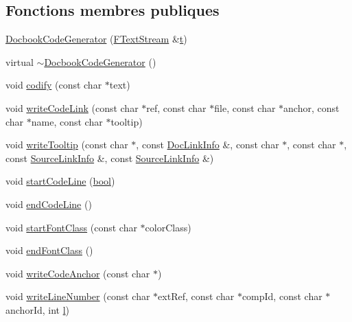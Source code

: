 \subsection*{Fonctions membres publiques}
\begin{DoxyCompactItemize}
\item 
\hyperlink{class_docbook_code_generator_a614697e6789639f7e8b67a7ba2ac31d3}{Docbook\+Code\+Generator} (\hyperlink{class_f_text_stream}{F\+Text\+Stream} \&\hyperlink{058__bracket__recursion_8tcl_a69e959f6901827e4d8271aeaa5fba0fc}{t})
\item 
virtual \hyperlink{class_docbook_code_generator_a9280e0d73c93714828a3650102ccef58}{$\sim$\+Docbook\+Code\+Generator} ()
\item 
void \hyperlink{class_docbook_code_generator_a7c2c177e3e6e0485e9806a75b45bd7a3}{codify} (const char $\ast$text)
\item 
void \hyperlink{class_docbook_code_generator_aecf4ade98ac3d63f22e3632f7dfb987a}{write\+Code\+Link} (const char $\ast$ref, const char $\ast$file, const char $\ast$anchor, const char $\ast$name, const char $\ast$tooltip)
\item 
void \hyperlink{class_docbook_code_generator_a5ce309cd68be3ce9eabbd2e522c1c286}{write\+Tooltip} (const char $\ast$, const \hyperlink{struct_doc_link_info}{Doc\+Link\+Info} \&, const char $\ast$, const char $\ast$, const \hyperlink{struct_source_link_info}{Source\+Link\+Info} \&, const \hyperlink{struct_source_link_info}{Source\+Link\+Info} \&)
\item 
void \hyperlink{class_docbook_code_generator_aa6af9297cbb2be8c975d0d123cf6d3b1}{start\+Code\+Line} (\hyperlink{qglobal_8h_a1062901a7428fdd9c7f180f5e01ea056}{bool})
\item 
void \hyperlink{class_docbook_code_generator_ab457dd3ab8b99073d9d2cc6f566bb712}{end\+Code\+Line} ()
\item 
void \hyperlink{class_docbook_code_generator_ab39e3a862244d1c8926895d69240ca0d}{start\+Font\+Class} (const char $\ast$color\+Class)
\item 
void \hyperlink{class_docbook_code_generator_a06537ef3f7d9c2cb4b9b0293f43d9151}{end\+Font\+Class} ()
\item 
void \hyperlink{class_docbook_code_generator_ac0f7f4cd4fec98da2855978adf786a04}{write\+Code\+Anchor} (const char $\ast$)
\item 
void \hyperlink{class_docbook_code_generator_a0230dcc0e6ee8d3323571df44c5178ba}{write\+Line\+Number} (const char $\ast$ext\+Ref, const char $\ast$comp\+Id, const char $\ast$anchor\+Id, int \hyperlink{060__command__switch_8tcl_aff56f84b49947b84b2a304f51cf8e678}{l})

\end{DoxyCompactItemize}
